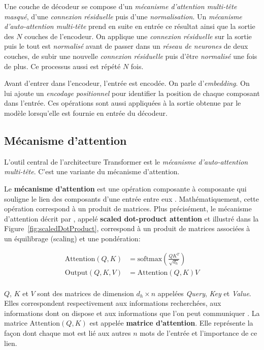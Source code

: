 \documentclass{report}
\begin{document}
    Une couche de décodeur se compose d'un \emph{mécanisme d'attention multi-tête masqué}, d'une \emph{connexion résiduelle} puis d'une \emph{normalisation}. Un \emph{mécanisme d'auto-attention multi-tête} prend en suite en entrée ce résultat ainsi que la sortie des $N$ couches de  l'encodeur. On applique une \emph{connexion résiduelle} sur la sortie puis le tout est \emph{normalisé} avant de passer dans un \emph{réseau de neurones} de deux couches, de subir une nouvelle \emph{connexion résiduelle} puis d'être \emph{normalisé} une fois de plus. Ce processus aussi est répété $N$ fois.
    
    Avant d'entrer dans l'encodeur, l'entrée est encodée. On parle d'\emph{embedding}. On lui ajoute un \emph{encodage positionnel} pour identifier la position de chaque composant dans l'entrée. Ces opérations sont aussi appliquées à la sortie obtenue par le modèle lorsqu'elle est fournie en entrée du décodeur.
    
    
    \subsection{Mécanisme d'attention}
    \label{ssec:mecattention}
    
    L'outil central de l'architecture Transformer est le \emph{mécanisme d'auto-attention multi-tête}. C'est une variante du mécanisme d'attention.
    
    Le \textbf{mécanisme d'attention} est une opération composante à composante qui souligne le lien des composants d'une entrée entre eux \cite{morgan_explainable_2023}.  Mathématiquement, cette opération correspond à un produit de matrices. Plus précisément, le mécanisme d'attention décrit par \cite{vaswani_attention_2017}, appelé \textbf{scaled dot-product attention} et illustré dans la Figure~\ref{fig:scaledDotProduct}, correspond à un produit de matrices associées à un équilibrage (scaling) et une pondération:
    
    \begin{align*}
        \text{Attention}(Q,K) &= \text{softmax}(\frac{QK^T}{\sqrt{d_h}})\\
        \text{Output}(Q,K,V) &= \text{Attention}(Q,K)V\\
    \end{align*}
    
    
    $Q$, $K$ et $V$ sont des matrices de dimension $d_h\times n$ appelées \emph{Query}, \emph{Key} et \emph{Value}. Elles correspondent respectivement aux informations recherchées, aux informations dont on dispose et aux informations que l'on peut communiquer \cite{morgan_explainable_2023}. La matrice $\text{Attention}(Q,K)$ est appelée \textbf{matrice d'attention}. Elle représente la façon dont chaque mot est lié aux autres $n$ mots de l'entrée et l'importance de ce lien.
    
\end{document}
